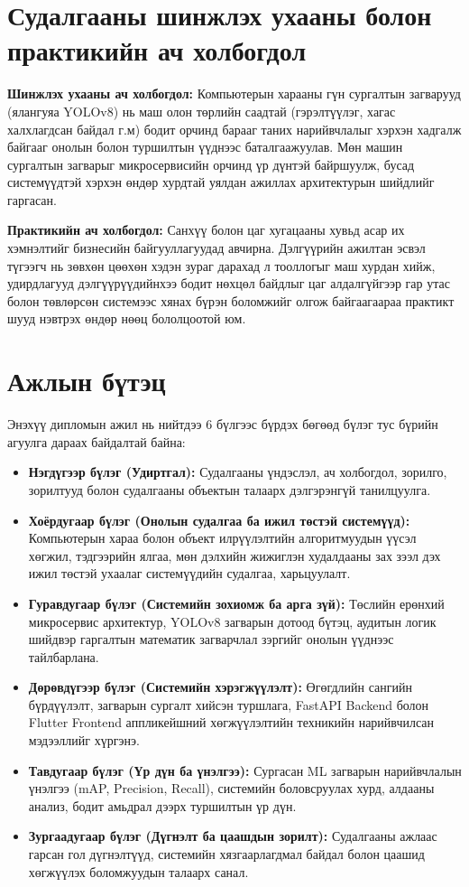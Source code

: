 \section{Судалгааны шинжлэх ухааны болон практикийн ач холбогдол}
\textbf{Шинжлэх ухааны ач холбогдол:}
Компьютерын харааны гүн сургалтын загварууд (ялангуяа YOLOv8) нь маш олон төрлийн саадтай (гэрэлтүүлэг, хагас халхлагдсан байдал г.м) бодит орчинд барааг таних нарийвчлалыг хэрхэн хадгалж байгааг онолын болон туршилтын үүднээс баталгаажуулав. Мөн машин сургалтын загварыг микросервисийн орчинд үр дүнтэй байршуулж, бусад системүүдтэй хэрхэн өндөр хурдтай уялдан ажиллах архитектурын шийдлийг гаргасан.

\textbf{Практикийн ач холбогдол:}
Санхүү болон цаг хугацааны хувьд асар их хэмнэлтийг бизнесийн байгууллагуудад авчирна. Дэлгүүрийн ажилтан эсвэл түгээгч нь зөвхөн цөөхөн хэдэн зураг дарахад л тооллогыг маш хурдан хийж, удирдлагууд дэлгүүрүүдийнхээ бодит нөхцөл байдлыг цаг алдалгүйгээр гар утас болон төвлөрсөн системээс хянах бүрэн боломжийг олгож байгаагаараа практикт шууд нэвтрэх өндөр нөөц бололцоотой юм.

\section{Ажлын бүтэц}
Энэхүү дипломын ажил нь нийтдээ 6 бүлгээс бүрдэх бөгөөд бүлэг тус бүрийн агуулга дараах байдалтай байна:
\begin{itemize}
    \item \textbf{Нэгдүгээр бүлэг (Удиртгал):} Судалгааны үндэслэл, ач холбогдол, зорилго, зорилтууд болон судалгааны объектын талаарх дэлгэрэнгүй танилцуулга.
    \item \textbf{Хоёрдугаар бүлэг (Онолын судалгаа ба ижил төстэй системүүд):} Компьютерын хараа болон объект илрүүлэлтийн алгоритмуудын үүсэл хөгжил, тэдгээрийн ялгаа, мөн дэлхийн жижиглэн худалдааны зах зээл дэх ижил төстэй ухаалаг системүүдийн судалгаа, харьцуулалт.
    \item \textbf{Гуравдугаар бүлэг (Системийн зохиомж ба арга зүй):} Төслийн ерөнхий микросервис архитектур, YOLOv8 загварын дотоод бүтэц, аудитын логик шийдвэр гаргалтын математик загварчлал зэргийг онолын үүднээс тайлбарлана.
    \item \textbf{Дөрөвдүгээр бүлэг (Системийн хэрэгжүүлэлт):} Өгөгдлийн сангийн бүрдүүлэлт, загварын сургалт хийсэн туршлага, FastAPI Backend болон Flutter Frontend аппликейшний хөгжүүлэлтийн техникийн нарийвчилсан мэдээллийг хүргэнэ.
    \item \textbf{Тавдугаар бүлэг (Үр дүн ба үнэлгээ):} Сургасан ML загварын нарийвчлалын үнэлгээ (mAP, Precision, Recall), системийн боловсруулах хурд, алдааны анализ, бодит амьдрал дээрх туршилтын үр дүн.
    \item \textbf{Зургаадугаар бүлэг (Дүгнэлт ба цаашдын зорилт):} Судалгааны ажлаас гарсан гол дүгнэлтүүд, системийн хязгаарлагдмал байдал болон цаашид хөгжүүлэх боломжуудын талаарх санал.
\end{itemize}
